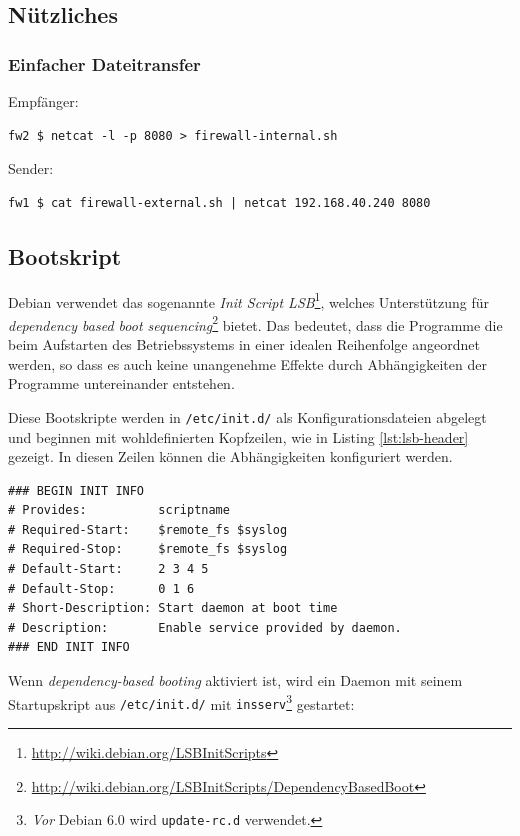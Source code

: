 \subsection{Nützliches}

\subsubsection{Einfacher Dateitransfer}

\noindent Empfänger:
\begin{verbatim}
fw2 $ netcat -l -p 8080 > firewall-internal.sh
\end{verbatim}

\noindent Sender:
\begin{verbatim}
fw1 $ cat firewall-external.sh | netcat 192.168.40.240 8080
\end{verbatim}


\subsection{Bootskript}

Debian verwendet das sogenannte \emph{Init Script LSB}\footnote{
\url{http://wiki.debian.org/LSBInitScripts}}, welches Unterstützung
für \emph{dependency based boot sequencing}\footnote{
\url{http://wiki.debian.org/LSBInitScripts/DependencyBasedBoot}
} bietet. Das bedeutet, dass
die Programme die beim Aufstarten des Betriebssystems in einer idealen
Reihenfolge angeordnet werden, so dass es auch keine unangenehme Effekte
durch Abhängigkeiten der Programme untereinander entstehen.

Diese Bootskripte werden in {\tt /etc/init.d/} als Konfigurationsdateien
abgelegt und beginnen mit wohldefinierten Kopfzeilen, wie in Listing
\ref{lst:lsb-header} gezeigt. In diesen Zeilen können die Abhängigkeiten
konfiguriert werden.

\begin{lstlisting}[label=lst:lsb-header,caption={Init Script LSB: Kopfzeilen.}]
### BEGIN INIT INFO
# Provides:          scriptname
# Required-Start:    $remote_fs $syslog
# Required-Stop:     $remote_fs $syslog
# Default-Start:     2 3 4 5
# Default-Stop:      0 1 6
# Short-Description: Start daemon at boot time
# Description:       Enable service provided by daemon.
### END INIT INFO
\end{lstlisting}

Wenn \emph{dependency-based booting} aktiviert ist, wird ein Daemon mit seinem
Startupskript aus {\tt /etc/init.d/} mit {\tt insserv}\footnote{
\emph{Vor} Debian 6.0 wird {\tt update-rc.d} verwendet.
} gestartet:

